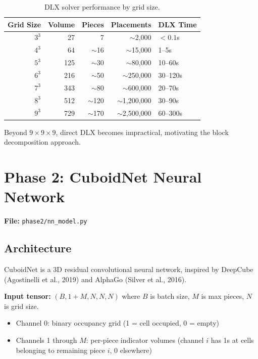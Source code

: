 \documentclass[11pt]{article}
\begin{document}
\begin{table}[H]
\centering
\begin{tabular}{@{}rrrrl@{}}
\toprule
\textbf{Grid Size} & \textbf{Volume} & \textbf{Pieces} & \textbf{Placements} & \textbf{DLX Time} \\
\midrule
$3^3$ & 27 & 7 & $\sim$2,000 & $< 0.1$s \\
$4^3$ & 64 & $\sim$16 & $\sim$15,000 & 1--5s \\
$5^3$ & 125 & $\sim$30 & $\sim$80,000 & 10--60s \\
$6^3$ & 216 & $\sim$50 & $\sim$250,000 & 30--120s \\
$7^3$ & 343 & $\sim$80 & $\sim$600,000 & 20--70s \\
$8^3$ & 512 & $\sim$120 & $\sim$1,200,000 & 30--90s \\
$9^3$ & 729 & $\sim$170 & $\sim$2,500,000 & 60--300s \\
\bottomrule
\end{tabular}
\caption{DLX solver performance by grid size.}
\end{table}

Beyond $9 \times 9 \times 9$, direct DLX becomes impractical, motivating the block decomposition approach.

\section{Phase 2: CuboidNet Neural Network}

\textbf{File:} \texttt{phase2/nn\_model.py}

\subsection{Architecture}

CuboidNet is a 3D residual convolutional neural network, inspired by DeepCube (Agostinelli et al., 2019) and AlphaGo (Silver et al., 2016).

\textbf{Input tensor:} $(B, 1{+}M, N, N, N)$ where $B$ is batch size, $M$ is max pieces, $N$ is grid size.
\begin{itemize}[nosep]
  \item Channel 0: binary occupancy grid (1 = cell occupied, 0 = empty)
  \item Channels 1 through $M$: per-piece indicator volumes (channel $i$ has 1s at cells belonging to remaining piece $i$, 0 elsewhere)
\end{itemize}
\end{document}
